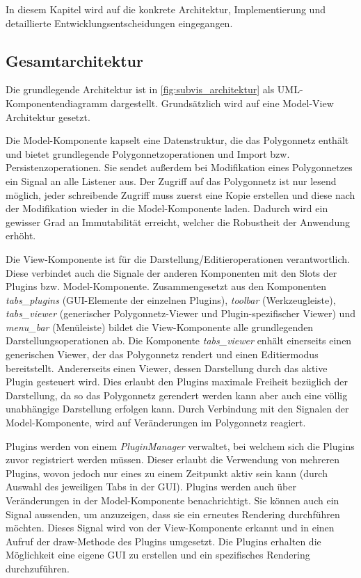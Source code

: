 In diesem Kapitel wird auf die konkrete Architektur, Implementierung und detaillierte Entwicklungsentscheidungen eingegangen.

\subsection{Gesamtarchitektur}

Die grundlegende Architektur ist in \autoref{fig:subvis_architektur} als UML-Komponentendiagramm dargestellt. 
Grundsätzlich wird auf eine Model-View Architektur gesetzt.

Die Model-Komponente kapselt eine Datenstruktur, die das Polygonnetz enthält und bietet grundlegende Polygonnetzoperationen und Import bzw. Persistenzoperationen.
Sie sendet außerdem bei Modifikation eines Polygonnetzes ein Signal an alle Listener aus.
Der Zugriff auf das Polygonnetz ist nur lesend möglich, jeder schreibende Zugriff muss zuerst eine Kopie erstellen und diese nach der Modifikation wieder in die Model-Komponente laden.
Dadurch wird ein gewisser Grad an Immutabilität erreicht, welcher die Robustheit der Anwendung erhöht.

Die View-Komponente ist für die Darstellung/Editieroperationen verantwortlich.
Diese verbindet auch die Signale der anderen Komponenten mit den Slots der Plugins bzw. Model-Komponente.
Zusammengesetzt aus den Komponenten \emph{tabs\_plugins} (GUI-Elemente der einzelnen Plugins), \emph{toolbar} (Werkzeugleiste), \emph{tabs\_viewer} (generischer Polygonnetz-Viewer und Plugin-spezifischer Viewer) und \emph{menu\_bar} (Menüleiste) bildet die View-Komponente alle grundlegenden Darstellungsoperationen ab.
Die Komponente \emph{tabs\_viewer} enhält einerseits einen generischen Viewer, der das Polygonnetz rendert und einen Editiermodus bereitstellt. 
Andererseits einen Viewer, dessen Darstellung durch das aktive Plugin gesteuert wird.
Dies erlaubt den Plugins maximale Freiheit bezüglich der Darstellung, da so das Polygonnetz gerendert werden kann aber auch eine völlig unabhängige Darstellung erfolgen kann.
Durch Verbindung mit den Signalen der Model-Komponente, wird auf Veränderungen im Polygonnetz reagiert.

Plugins werden von einem \emph{PluginManager} verwaltet, bei welchem sich die Plugins zuvor registriert werden müssen.
Dieser erlaubt die Verwendung von mehreren Plugins, wovon jedoch nur eines zu einem Zeitpunkt aktiv sein kann (durch Auswahl des jeweiligen Tabs in der GUI).
Plugins werden auch über Veränderungen in der Model-Komponente benachrichtigt.
Sie können auch ein Signal aussenden, um anzuzeigen, dass sie ein erneutes Rendering durchführen möchten.
Dieses Signal wird von der View-Komponente erkannt und in einen Aufruf der draw-Methode des Plugins umgesetzt.
Die Plugins erhalten die Möglichkeit eine eigene GUI zu erstellen und ein spezifisches Rendering durchzuführen.

